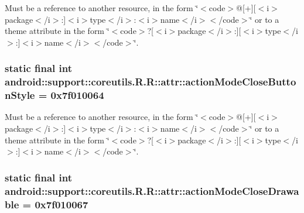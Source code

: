 Must be a reference to another resource, in the form \char`\"{}$<$code$>$@\mbox{[}+\mbox{]}\mbox{[}$<$i$>$package$<$/i$>$:\mbox{]}$<$i$>$type$<$/i$>$:$<$i$>$name$<$/i$>$$<$/code$>$\char`\"{} or to a theme attribute in the form \char`\"{}$<$code$>$?\mbox{[}$<$i$>$package$<$/i$>$:\mbox{]}\mbox{[}$<$i$>$type$<$/i$>$:\mbox{]}$<$i$>$name$<$/i$>$$<$/code$>$\char`\"{}. \hypertarget{classandroid_1_1support_1_1coreutils_1_1_r_1_1attr_5ea664b76e4338b4b55fb42ee3f200d6}{
\subsubsection[{actionModeCloseButtonStyle}]{\setlength{\rightskip}{0pt plus 5cm}static final int android::support::coreutils.R.R::attr::actionModeCloseButtonStyle = 0x7f010064}}
\label{classandroid_1_1support_1_1coreutils_1_1_r_1_1attr_5ea664b76e4338b4b55fb42ee3f200d6}


Must be a reference to another resource, in the form \char`\"{}$<$code$>$@\mbox{[}+\mbox{]}\mbox{[}$<$i$>$package$<$/i$>$:\mbox{]}$<$i$>$type$<$/i$>$:$<$i$>$name$<$/i$>$$<$/code$>$\char`\"{} or to a theme attribute in the form \char`\"{}$<$code$>$?\mbox{[}$<$i$>$package$<$/i$>$:\mbox{]}\mbox{[}$<$i$>$type$<$/i$>$:\mbox{]}$<$i$>$name$<$/i$>$$<$/code$>$\char`\"{}. \hypertarget{classandroid_1_1support_1_1coreutils_1_1_r_1_1attr_47c64ff4eca67035c25f86e093d12973}{
\subsubsection[{actionModeCloseDrawable}]{\setlength{\rightskip}{0pt plus 5cm}static final int android::support::coreutils.R.R::attr::actionModeCloseDrawable = 0x7f010067}}
\label{classandroid_1_1support_1_1coreutils_1_1_r_1_1attr_47c64ff4eca67035c25f86e093d12973}


